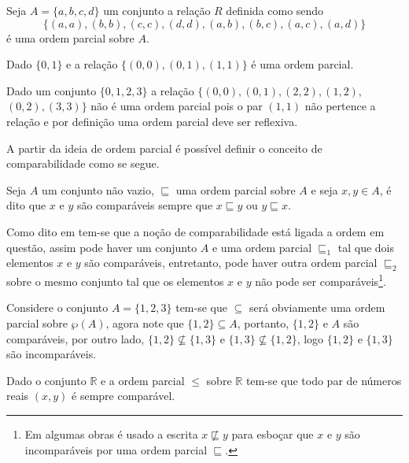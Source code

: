 \begin{exemplo}
	Seja $A = \{a, b, c, d\}$ um conjunto a relação $R$ definida como sendo 
  $$\{(a, a), (b, b), (c, c), (d, d), (a, b), (b, c), (a, c), (a, d)\}$$ 
  é uma ordem parcial sobre $A$.
\end{exemplo}

\begin{exemplo}
	Dado $\{0,1\}$ e a relação $\{(0,0), (0, 1), (1, 1)\}$ é uma ordem parcial.
\end{exemplo}

\begin{exemplo}
	Dado um conjunto $\{0, 1, 2, 3\}$ a relação $\{(0, 0), (0, 1), (2, 2), (1, 2),$ $(0, 2), (3, 3)\}$ não é uma ordem parcial pois o par $(1, 1)$ não pertence a relação e por definição uma ordem parcial deve ser reflexiva.
\end{exemplo}

A partir da ideia de ordem parcial é possível definir o conceito de comparabilidade como se segue.

\begin{definicao}[Comparabilidade]\label{def:Comparabilidade}
	Seja $A$ um conjunto não vazio, $\sqsubseteq$ uma ordem parcial sobre $A$ e seja $x, y \in A$, é dito que $x$ e $y$ são comparáveis sempre que $x \sqsubseteq y$ ou $y \sqsubseteq x$.
\end{definicao}

Como dito em \cite{abe1991-TC, carmo2013} tem-se que a noção de comparabilidade está ligada a ordem em questão, assim pode haver um conjunto $A$ e uma ordem parcial $\sqsubseteq_1$ tal que dois elementos $x$ e $y$ são comparáveis, entretanto, pode haver outra ordem parcial $\sqsubseteq_2$ sobre o mesmo conjunto tal que os elementos $x$ e $y$ não pode ser comparáveis\footnote{Em algumas obras é usado a escrita $x \not\sqsubseteq y$ para esboçar que $x$ e $y$ são incomparáveis por uma ordem parcial $\sqsubseteq$.}.

\begin{exemplo}
	Considere o conjunto $A = \{1, 2, 3\}$ tem-se que $\subseteq$ será obviamente uma ordem parcial sobre $\wp(A)$, agora note que $\{1, 2\} \subseteq A$, portanto, $\{1, 2\}$ e $A$ são comparáveis, por outro lado, $\{1, 2\} \not\subseteq \{1, 3\}$ e $\{1, 3\} \not\subseteq \{1, 2\}$, logo $\{1, 2\}$ e $\{1, 3\}$ são incomparáveis.
\end{exemplo}

\begin{exemplo}
  Dado o conjunto $\mathbb{R}$ e a ordem parcial $\leq$ sobre $\mathbb{R}$ tem-se que todo par de números reais $(x, y)$ é sempre comparável.
\end{exemplo}

